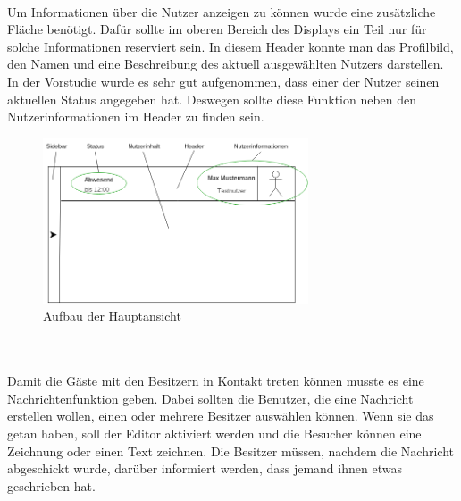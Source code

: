 \\
Um Informationen über die Nutzer anzeigen zu können wurde eine zusätzliche Fläche benötigt. Dafür sollte im oberen Bereich des Displays ein Teil nur für solche Informationen reserviert sein. In diesem Header konnte man das Profilbild, den Namen und eine Beschreibung des aktuell ausgewählten Nutzers darstellen.
In der Vorstudie wurde es sehr gut aufgenommen, dass einer der Nutzer seinen aktuellen Status angegeben hat. Deswegen sollte diese Funktion neben den Nutzerinformationen im Header zu finden sein.
\begin{figure}[h!]
  \centering
    \includegraphics[width=0.7\textwidth]{./img/MainViewAufbau.png}
  \caption{Aufbau der Hauptansicht}
  \label{img:mainView}
\end{figure}
\\
\\
Damit die Gäste mit den Besitzern in Kontakt treten können musste es eine Nachrichtenfunktion geben. Dabei sollten die Benutzer, die eine Nachricht erstellen wollen, einen oder mehrere Besitzer auswählen können. Wenn sie das getan haben, soll der Editor aktiviert werden und die Besucher können eine Zeichnung oder einen Text zeichnen. Die Besitzer müssen, nachdem die Nachricht abgeschickt wurde, darüber informiert werden, dass jemand ihnen etwas geschrieben hat.

